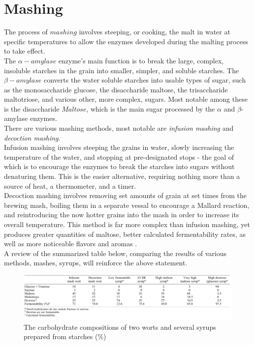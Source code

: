 \documentclass[twoside]{ctuthesis}
\theoremstyle{plain}
\theoremstyle{definition}
\theoremstyle{note}
\begin{document}
\section{Mashing}
The process of $mashing$ involves steeping, or cooking, the malt in water at specific temperatures to allow the enzymes developed during the malting process to take effect.\\
The $\alpha-amylase$ enzyme's main function is to break the large, complex, insoluble starches in the grain into smaller, simpler, and soluble starches. The $\beta-amylase$ converts the water soluble starches into usable types of sugar, such as the monosaccharide glucose, the disaccharide maltose, the trisaccharide maltotriose, and various other, more complex, sugars. Most notable among these is the disaccharide $Maltose$, which is the main sugar processed by the $\alpha$ and $\beta$-amylase enzymes.\\
There are various mashing methods, most notable are \textit{infusion mashing} and \textit{decoction mashing}.\\
Infusion mashing involves steeping the grains in water, slowly increasing the temperature of the water, and stopping at pre-designated stops - the goal of which is to encourage the enzymes to break the starches into sugars without denaturing them. This is the easier alternative, requiring nothing more than a source of heat, a thermometer, and a timer. \\
Decoction mashing involves removing set amounts of grain at set times from the brewing mash, boiling them in a separate vessal to encourage a Mallard reaction, and reintroducing the now hotter grains into the mash in order to increase its overall temperature. This method is far more complex than infusion mashing, yet produces greater quantities of maltose, better calculated fermentability rates, as well as more noticeable flavors and aromas \cite{Brewing_Science}.\\
A review of the summarized table below, comparing the results of various methods, mashes, syrups, will reinforce the above statement.

\begin{figure}[H]
	\centering
	\includegraphics[width = \textwidth]{MashingTable}
\begin{table}[H]
	\caption{The carbohydrate compositions of two worts and several syrups prepared from starches ($\%$)\cite{Brewing_Science}}
\end{table}
\end{figure}
\end{document}
